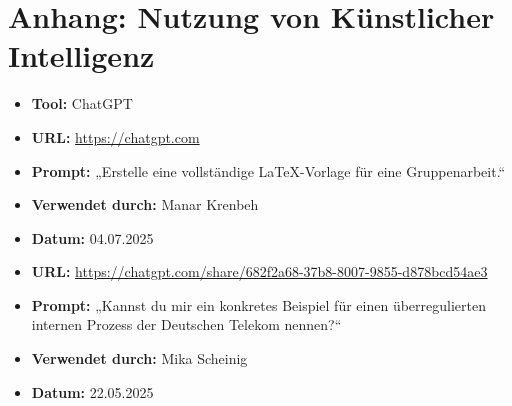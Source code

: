 \documentclass[12pt,a4paper]{article}
\begin{document}
	\newpage
	\section{Anhang: Nutzung von Künstlicher Intelligenz}
	\begin{itemize}
		\item \textbf{Tool:} ChatGPT
		\item \textbf{URL:} \url{https://chatgpt.com}
		\item \textbf{Prompt:} „Erstelle eine vollständige LaTeX-Vorlage für eine Gruppenarbeit.“
		\item \textbf{Verwendet durch:} Manar Krenbeh
		\item \textbf{Datum:} 04.07.2025
	\end{itemize}
	\begin{itemize}
		\item \textbf{URL:} \url{https://chatgpt.com/share/682f2a68-37b8-8007-9855-d878bcd54ae3}
		\item \textbf{Prompt:} „Kannst du mir ein konkretes Beispiel für einen überregulierten internen Prozess der Deutschen Telekom nennen?“
		\item \textbf{Verwendet durch:} Mika Scheinig
		\item \textbf{Datum:} 22.05.2025
	\end{itemize}
	
\end{document}
